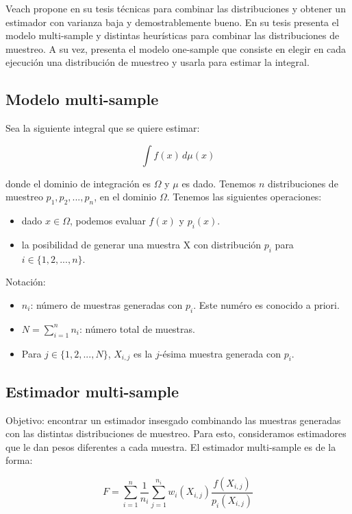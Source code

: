 \documentclass{article}
\begin{document}
Veach propone en su tesis técnicas para combinar las distribuciones y obtener un estimador con varianza baja y demostrablemente bueno.
En su tesis presenta el modelo multi-sample y distintas heurísticas para combinar las distribuciones de muestreo.
A su vez, presenta el modelo one-sample que consiste en elegir en cada ejecución una distribución de muestreo y usarla para estimar la integral.

\subsection{Modelo multi-sample}

Sea la siguiente integral que se quiere estimar:

$$ \int f(x) \,d\mu(x)$$

donde el dominio de integración es $\Omega$ y $\mu$ es dado. Tenemos $n$ distribuciones de muestreo $p_{1}, p_{2}, ..., p_{n}$, en el dominio $\Omega$.
Tenemos las siguientes operaciones:
\begin{itemize}
    \item dado $x \in \Omega$, podemos evaluar $f(x)$ y $p_{i}(x)$.
    \item la posibilidad de generar una muestra X con distribución $p_{i}$ para $i \in \{1, 2, ..., n\}$.
\end{itemize}

Notación:
\begin{itemize}
    \item $n_{i}$: número de muestras generadas con $p_{i}$. Este numéro es conocido a priori.
    \item $N = \sum_{i=1}^{n} n_{i}$: número total de muestras.
    \item Para $j \in \{1, 2, ..., N\}$, $X_{i,j}$ es la $j$-ésima muestra generada con $p_{i}$.
\end{itemize}

\subsection{Estimador multi-sample}

Objetivo: encontrar un estimador insesgado combinando las muestras generadas con las distintas distribuciones de muestreo.
Para esto, consideramos estimadores que le dan pesos diferentes a cada muestra.
El estimador multi-sample es de la forma:

$$F = \sum_{i=1}^{n} \frac{1}{n_{i}} \sum_{j=1}^{n_{i}} w_{i}(X_{i,j}) \frac{f(X_{i,j})}{p_{i}(X_{i,j})}$$
\end{document}
